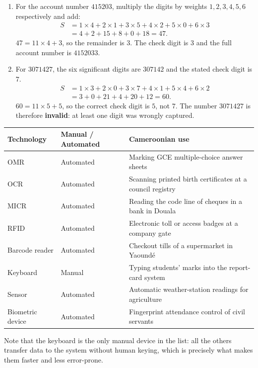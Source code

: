 \documentclass[11pt]{article}
\begin{document}
\begin{corrige}
\begin{enumerate}
\item For the account number $415203$, multiply the digits by weights $1,2,3,4,5,6$ respectively and add:
\begin{align*}
S &= 1\times 4 + 2\times 1 + 3\times 5 + 4\times 2 + 5\times 0 + 6\times 3\\
  &= 4 + 2 + 15 + 8 + 0 + 18 = 47.
\end{align*}
$47 = 11 \times 4 + 3$, so the remainder is $3$. The check digit is $\boxed{3}$ and the full account number is $4152033$.
\item For $3071427$, the six significant digits are $307142$ and the stated check digit is $7$.
\begin{align*}
S &= 1\times 3 + 2\times 0 + 3\times 7 + 4\times 1 + 5\times 4 + 6\times 2\\
  &= 3 + 0 + 21 + 4 + 20 + 12 = 60.
\end{align*}
$60 = 11 \times 5 + 5$, so the correct check digit is $5$, not $7$. The number $3071427$ is therefore \textbf{invalid}: at least one digit was wrongly captured.
\end{enumerate}
\end{corrige}

\begin{corrige}
\begin{center}
\begin{tabularx}{\linewidth}{|l|l|X|}
\hline
\rowcolor{popblueL} \textbf{Technology} & \textbf{Manual / Automated} & \textbf{Cameroonian use} \\
\hline
OMR & Automated & Marking GCE multiple-choice answer sheets \\
\hline
OCR & Automated & Scanning printed birth certificates at a council registry \\
\hline
MICR & Automated & Reading the code line of cheques in a bank in Douala \\
\hline
RFID & Automated & Electronic toll or access badges at a company gate \\
\hline
Barcode reader & Automated & Checkout tills of a supermarket in Yaoundé \\
\hline
Keyboard & Manual & Typing students' marks into the report-card system \\
\hline
Sensor & Automated & Automatic weather-station readings for agriculture \\
\hline
Biometric device & Automated & Fingerprint attendance control of civil servants \\
\hline
\end{tabularx}
\end{center}
Note that the keyboard is the only manual device in the list: all the others transfer data to the system without human keying, which is precisely what makes them faster and less error-prone.
\end{corrige}
\end{document}
